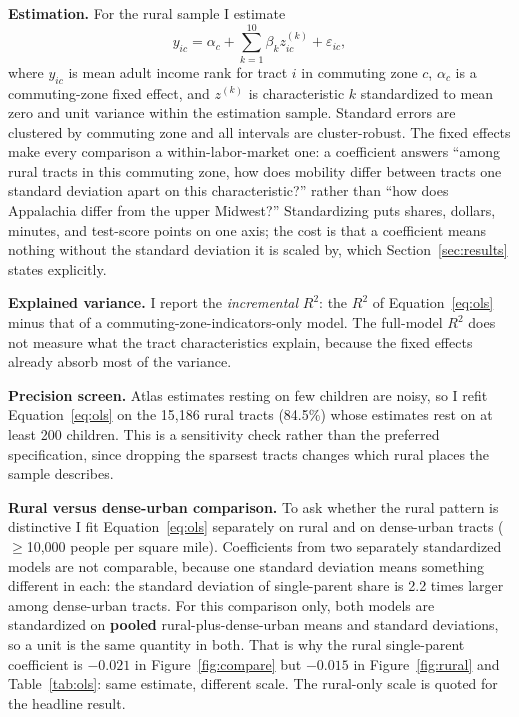 \documentclass[9pt,twoside]{pnas-new}
\begin{document}
\noindent\textbf{Estimation.} For the rural sample I estimate
\begin{equation}
y_{ic} = \alpha_c + \sum_{k=1}^{10} \beta_k z_{ic}^{(k)} + \varepsilon_{ic},
\label{eq:ols}
\end{equation}
where $y_{ic}$ is mean adult income rank for tract $i$ in commuting zone $c$,
$\alpha_c$ is a commuting-zone fixed effect, and $z^{(k)}$ is characteristic
$k$ standardized to mean zero and unit variance within the estimation sample.
Standard errors are clustered by commuting zone and all intervals are
cluster-robust. The fixed effects make every comparison a within-labor-market
one: a coefficient answers ``among rural tracts in this commuting zone, how
does mobility differ between tracts one standard deviation apart on this
characteristic?'' rather than ``how does Appalachia differ from the upper
Midwest?'' Standardizing puts shares, dollars, minutes, and test-score points
on one axis; the cost is that a coefficient means nothing without the standard
deviation it is scaled by, which Section~\ref{sec:results} states explicitly.

\noindent\textbf{Explained variance.} I report the \emph{incremental} $R^2$: the
$R^2$ of Equation~\ref{eq:ols} minus that of a commuting-zone-indicators-only
model. The full-model $R^2$ does not measure what the tract characteristics
explain, because the fixed effects already absorb most of the variance.

\noindent\textbf{Precision screen.} Atlas estimates resting on few children are
noisy, so I refit Equation~\ref{eq:ols} on the 15{,}186 rural tracts (84.5\%)
whose estimates rest on at least 200 children. This is a sensitivity check
rather than the preferred specification, since dropping the sparsest tracts
changes which rural places the sample describes.

\noindent\textbf{Rural versus dense-urban comparison.} To ask whether the rural
pattern is distinctive I fit Equation~\ref{eq:ols} separately on rural and on
dense-urban tracts ($\geq$10{,}000 people per square mile). Coefficients from
two separately standardized models are not comparable, because one standard
deviation means something different in each: the standard deviation of
single-parent share is 2.2 times larger among dense-urban tracts. For this
comparison only, both models are standardized on \textbf{pooled}
rural-plus-dense-urban means and standard deviations, so a unit is the same
quantity in both. That is why the rural single-parent coefficient is $-0.021$
in Figure~\ref{fig:compare} but $-0.015$ in Figure~\ref{fig:rural} and
Table~\ref{tab:ols}: same estimate, different scale. The rural-only scale is
quoted for the headline result.
\end{document}
